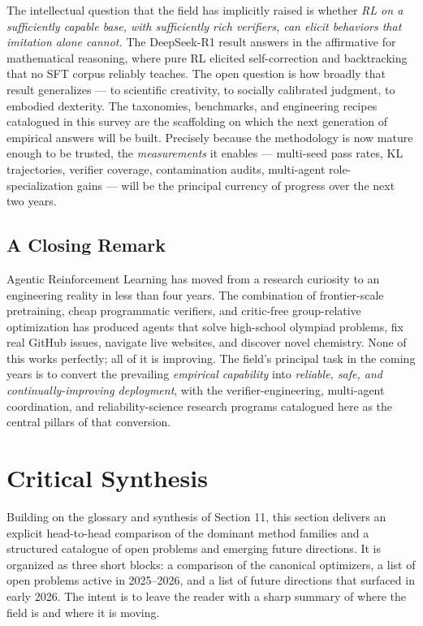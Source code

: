 The intellectual question that the field has implicitly raised is whether \emph{RL on a sufficiently capable base, with sufficiently rich verifiers, can elicit behaviors that imitation alone cannot.} The DeepSeek-R1 result answers in the affirmative for mathematical reasoning, where pure RL elicited self-correction and backtracking that no SFT corpus reliably teaches. The open question is how broadly that result generalizes --- to scientific creativity, to socially calibrated judgment, to embodied dexterity. The taxonomies, benchmarks, and engineering recipes catalogued in this survey are the scaffolding on which the next generation of empirical answers will be built. Precisely because the methodology is now mature enough to be trusted, the \emph{measurements} it enables --- multi-seed pass rates, KL trajectories, verifier coverage, contamination audits, multi-agent role-specialization gains --- will be the principal currency of progress over the next two years.

\subsection{A Closing Remark}\label{a-closing-remark}

Agentic Reinforcement Learning has moved from a research curiosity to an engineering reality in less than four years. The combination of frontier-scale pretraining, cheap programmatic verifiers, and critic-free group-relative optimization has produced agents that solve high-school olympiad problems, fix real GitHub issues, navigate live websites, and discover novel chemistry. None of this works perfectly; all of it is improving. The field's principal task in the coming years is to convert the prevailing \emph{empirical capability} into \emph{reliable, safe, and continually-improving deployment}, with the verifier-engineering, multi-agent coordination, and reliability-science research programs catalogued here as the central pillars of that conversion.

\section{Critical Synthesis}\label{critical-synthesis}

Building on the glossary and synthesis of Section 11, this section delivers an explicit head-to-head comparison of the dominant method families and a structured catalogue of open problems and emerging future directions. It is organized as three short blocks: a comparison of the canonical optimizers, a list of open problems active in 2025--2026, and a list of future directions that surfaced in early 2026. The intent is to leave the reader with a sharp summary of where the field is and where it is moving.

